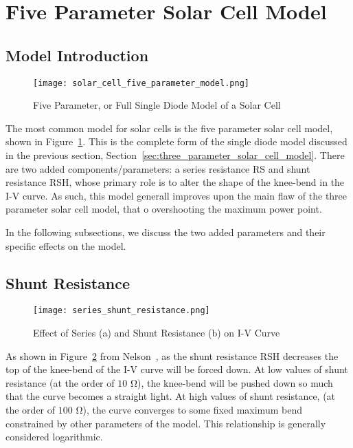 \section{Five Parameter Solar Cell Model}\label{sec:five_parameter_solar_cell_model}

\subsection{Model Introduction}\label{subsec:five_param_model_introduction}

\begin{figure}[h]
    \texttt{[image: solar\_cell\_five\_parameter\_model.png]}
    \caption{Five Parameter, or Full Single Diode Model of a Solar Cell}
    \label{fig:single_diode_model_with_resistances}
\end{figure}

The most common model for solar cells is the five parameter solar cell model,
shown in Figure~\ref{fig:single_diode_model_with_resistances}. This is the
complete form of the single diode model discussed in the previous section,
Section~\ref{sec:three_parameter_solar_cell_model}. There are two added
components/parameters: a series resistance \ac{RS} and shunt resistance
\ac{RSH}, whose primary role is to alter the shape of the knee-bend in the I-V
curve. As such, this model generall improves upon the main flaw of the three
parameter solar cell model, that o overshooting the maximum power point.

In the following subsections, we discuss the two added parameters and their
specific effects on the model.

\subsection{Shunt Resistance}\label{subsec:five_param_shunt_resistance}

\begin{figure}[h]
    \texttt{[image: series\_shunt\_resistance.png]}
    \caption{Effect of Series (a) and Shunt Resistance (b) on \ac{I-V} Curve}
    \label{fig:series_shunt_resistance}
\end{figure}

As shown in Figure~\ref{fig:series_shunt_resistance} from Nelson~\cite{nelson},
as the shunt resistance \ac{RSH} decreases the top of the knee-bend of the
\ac{I-V} curve will be forced down. At low values of shunt resistance (at the
order of $10$ $\si{\ohm}$), the knee-bend will be pushed down so much that the
curve becomes a straight light. At high values of shunt resistance, (at the
order of $100$ $\si{\ohm}$), the curve converges to some fixed maximum bend
constrained by other parameters of the model. This relationship is generally
considered logarithmic.

